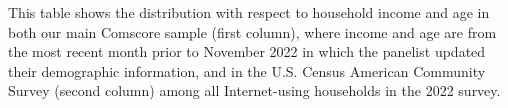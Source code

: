 \documentclass[12pt]{article}
\begin{document}
\begin{table}[htbp]
    \caption{\\ \centering  \textbf{Distribution by income and age, Comscore sample vs. ACS}}

    
\vspace{-0.1cm} \label{tab:sample-distribution} \footnotesize  This table shows the distribution with respect to household income and age in both our main Comscore sample (first column), where income and age are from the most recent month prior to November 2022 in which the panelist updated their demographic information, and in the U.S. Census American Community Survey (second column) among all Internet-using households in the 2022 survey.
\vspace{.1cm}


\end{table}
\end{document}
